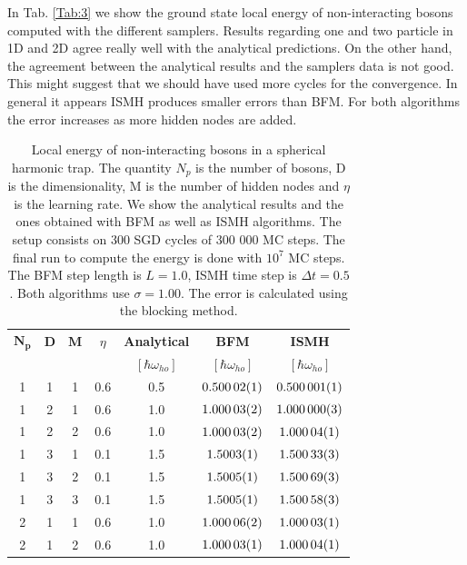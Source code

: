 In Tab. \ref{Tab:3} we show the ground state local energy of non-interacting bosons computed with the different samplers. Results regarding one and two particle in 1D and 2D agree really well with the analytical predictions. On the other hand, the agreement between the analytical results and the samplers data is not good. This might suggest that we should have used more cycles for the convergence. In general it appears ISMH produces smaller errors than BFM. For both algorithms the error increases as more hidden nodes are added.  

\begin{table}[H]
\centering
\caption{Local energy of non-interacting bosons in a spherical harmonic trap. The quantity $N_p$ is the number of bosons, D is the dimensionality, M is the number of hidden nodes and $\eta$ is the learning rate. We show the analytical results and the ones obtained with BFM as well as ISMH algorithms. The setup consists on 300 SGD cycles of 300 000 MC steps. The final run to compute the energy is done with $10^7$ MC steps. The BFM step length is $L=1.0$, ISMH time step is $\Delta t = 0.5$. Both algorithms use $\sigma = 1.00$.  The error is calculated using the blocking method.}
\begin{tabular}{c c c c |c c c} 
$\boldsymbol{N_p}$ & \textbf{D}  & $\boldsymbol{M}$ & $\eta$ & \textbf{Analytical} & \textbf{BFM} & \textbf{ISMH} \\
&&&&$[\hbar\omega_{ho}]$ &$[\hbar\omega_{ho}]$&$[\hbar\omega_{ho}]$\\\hline
1 & 1 & 1 & 0.6 & 0.5  & $\SI{0.50002\pm 0.00001}{}  $ & $\SI{0.500001\pm 0.000001}{}$ \\ \hline
1 & 2 & 1 &0.6 & 1.0   & $\SI{1.00003\pm 0.00002}{} $ & $\SI{1.000000\pm 0.000003}{}$ \\
1 & 2 & 2 &0.6 & 1.0   & $\SI{1.00003\pm 0.00002}{} $ & $\SI{1.00004\pm 0.00001}{}$ \\ \hline
1 & 3 & 1 &0.1 & 1.5  &  $\SI{1.5003\pm 0.0001}{} $ &  $\SI{1.50033\pm 0.00003}{}$\\
1 & 3 & 2 &0.1 & 1.5   &  $\SI{1.5005\pm 0.0001}{} $ & $\SI{1.50069\pm 0.00003}{}$ \\
1 & 3 & 3 &0.1 & 1.5   &  $\SI{1.5005\pm 0.0001}{}$&   $\SI{1.50058\pm 0.00003}{}$\\ \hline
2 & 1 & 1 &0.6 & 1.0  & $\SI{1.00006\pm 0.00002}{} $ & $\SI{1.00003\pm 0.00001}{}$ \\ 
2 & 1 & 2 &0.6 & 1.0  & $\SI{1.00003\pm 0.00001}{}$ & $\SI{1.00004\pm 0.00001}{}$ \\ \hline

\end{tabular}
\end{table}
